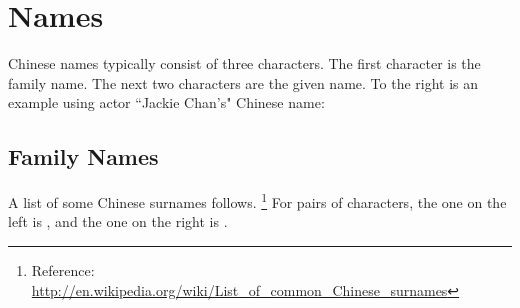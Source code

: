 ﻿%

\chapter{Names}
\begin{minipage}{\tw-60mm}
Chinese names typically consist of three characters.
The first character is the family name.
The next two characters are the given name.
To the right is an example using actor ``Jackie Chan's" Chinese name:%
\end{minipage}\hfill%

\section {Family Names}
A list of some Chinese surnames follows.
\footnote{Reference: \url{http://en.wikipedia.org/wiki/List_of_common_Chinese_surnames}}
For pairs of characters, the one on the left is ,
and the one on the right is .

